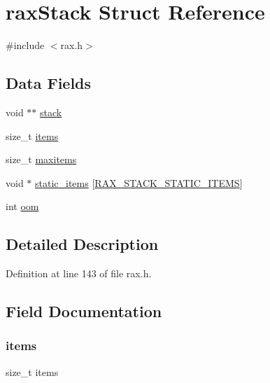 \hypertarget{structrax_stack}{}\section{rax\+Stack Struct Reference}
\label{structrax_stack}


{\ttfamily \#include $<$rax.\+h$>$}

\subsection*{Data Fields}
\begin{DoxyCompactItemize}
\item 
void $\ast$$\ast$ \hyperlink{structrax_stack_a1f13044ed8bc3e590b1658f295e312e6}{stack}
\item 
size\+\_\+t \hyperlink{structrax_stack_a172b85ef8ac505af2599402f7e390354}{items}
\item 
size\+\_\+t \hyperlink{structrax_stack_ab0e310064cc6a020cd4f1773760260a5}{maxitems}
\item 
void $\ast$ \hyperlink{structrax_stack_a4c9a6441368d8681f82baf35dec33bbb}{static\+\_\+items} \mbox{[}\hyperlink{rax_8h_aff05c7893713f82d106c046f55ac1bf5}{R\+A\+X\+\_\+\+S\+T\+A\+C\+K\+\_\+\+S\+T\+A\+T\+I\+C\+\_\+\+I\+T\+E\+MS}\mbox{]}
\item 
int \hyperlink{structrax_stack_a7a989ca8ec18f6d21a77acc9cd90d595}{oom}
\end{DoxyCompactItemize}


\subsection{Detailed Description}


Definition at line 143 of file rax.\+h.



\subsection{Field Documentation}
\mbox{\label{structrax_stack_a172b85ef8ac505af2599402f7e390354}} 
\subsubsection{\texorpdfstring{items}{items}}
{\footnotesize\ttfamily size\+\_\+t items}



